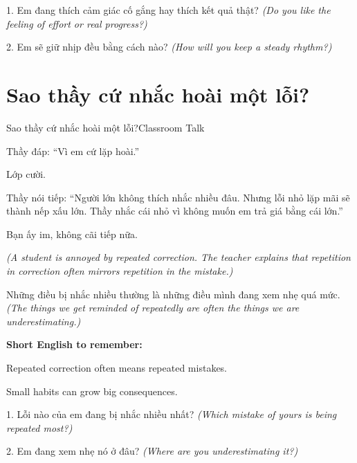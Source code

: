 \begin{tuhocnhanh}
1. Em đang thích cảm giác cố gắng hay thích kết quả thật? \textit{(Do you like the feeling of effort or real progress?)}

2. Em sẽ giữ nhịp đều bằng cách nào? \textit{(How will you keep a steady rhythm?)}
\end{tuhocnhanh}
\ngancach

\section{Sao thầy cứ nhắc hoài một lỗi?}
\begin{truyen}{Sao thầy cứ nhắc hoài một lỗi?}{Classroom Talk}

Thầy đáp: ``Vì em cứ lặp hoài.''

Lớp cười.

Thầy nói tiếp: ``Người lớn không thích nhắc nhiều đâu. Nhưng lỗi nhỏ lặp mãi sẽ thành nếp xấu lớn. Thầy nhắc cái nhỏ vì không muốn em trả giá bằng cái lớn.''

Bạn ấy im, không cãi tiếp nữa.

\textit{(A student is annoyed by repeated correction. The teacher explains that repetition in correction often mirrors repetition in the mistake.)}
\end{truyen}

\begin{baihoc}
Những điều bị nhắc nhiều thường là những điều mình đang xem nhẹ quá mức.
\textit{(The things we get reminded of repeatedly are often the things we are underestimating.)}
\end{baihoc}

\begin{ghinhoanh}
\textbf{Short English to remember:}

Repeated correction often means repeated mistakes.

Small habits can grow big consequences.
\end{ghinhoanh}

\begin{tuhocnhanh}
1. Lỗi nào của em đang bị nhắc nhiều nhất? \textit{(Which mistake of yours is being repeated most?)}

2. Em đang xem nhẹ nó ở đâu? \textit{(Where are you underestimating it?)}
\end{tuhocnhanh}
\ngancach


